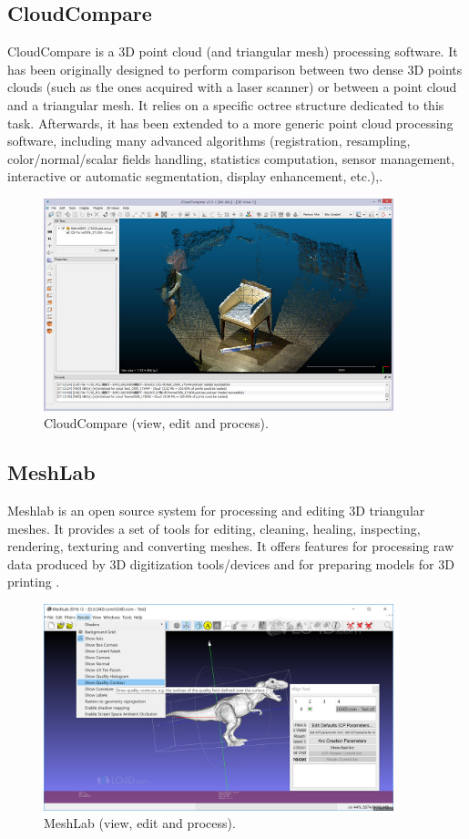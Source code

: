 \subsection{CloudCompare}
CloudCompare is a 3D point cloud (and triangular mesh) processing software. It has been originally designed to perform comparison between two dense 3D points clouds (such as the ones acquired with a laser scanner) or between a point cloud and a triangular mesh. It relies on a specific octree structure dedicated to this task.  Afterwards, it has been extended to a more generic point cloud processing software, including many advanced algorithms (registration, resampling, color/normal/scalar fields handling, statistics computation, sensor management, interactive or automatic segmentation, display enhancement, etc.)\cite{cloudcompare},. 

\begin{figure}[!h]
\begin{center}
\includegraphics[width=4in]{figures02/cloudcompare.jpg}
\caption{CloudCompare (view, edit and process).}
\end{center}
\end{figure}


\subsection{MeshLab}
Meshlab is an open source system for processing and editing 3D triangular meshes.
It provides a set of tools for editing, cleaning, healing, inspecting, rendering, texturing and converting meshes. It offers features for processing raw data produced by 3D digitization tools/devices and for preparing models for 3D printing \cite{meshlab}.

 \begin{figure}[!h]
\begin{center}
\includegraphics[width=4in]{figures02/meshlab.png}
\caption{MeshLab (view, edit and process).}
\end{center}
\end{figure}


